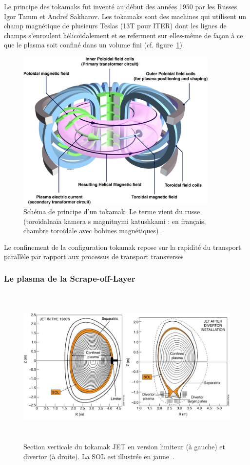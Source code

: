 \begin{refsection}
Le principe des tokamaks fut inventé au début des années 1950 par les Russes Igor Tamm et
Andreï Sakharov. Les tokamaks sont des machines qui utilisent
un champ magnétique de plusieurs Teslas (13T pour ITER) dont les lignes de
champs s'enroulent hélicoïdalement et se referment sur elles-même de façon à ce que le plasma soit
confiné dans un volume fini (cf. figure~\ref{tokamak}).
\begin{figure}[!htbp]
    \centering
	\includegraphics[height=80mm]{figures/1-tokamak.jpg}
	\caption{Schéma de principe d'un tokamak. Le terme vient du
russe (toroïdalnaïa kamera s magnitnymi katushkami : en français, chambre toroïdale avec bobines
magnétiques)~\parencite{efda}.}\label{tokamak}
\end{figure}

Le confinement de la configuration tokamak repose sur la rapidité du transport
parallèle par rapport aux processus de transport transverses

\subsubsection{Le plasma de la Scrape-off-Layer}
\begin{figure}[!htbp]
    \centering
	\includegraphics[height=80mm]{figures/1-limiterDivertor.jpg}
	\caption{Section verticale du tokamak JET en version limiteur
	(à gauche) et divertor (à droite). La SOL est illustrée en
	jaune~\parencite{efda}.}\label{SOL}
\end{figure}




\end{refsection}
